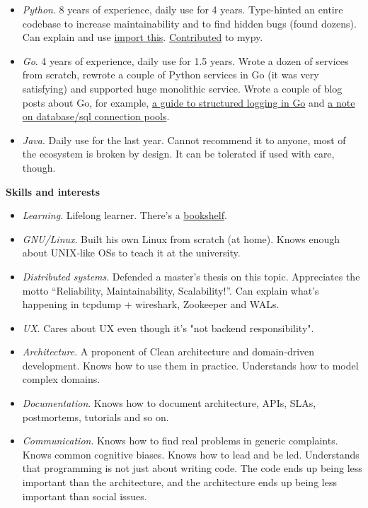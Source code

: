 \documentclass[final]{letter}
\begin{document}
\begin{itemize}
  \item \textit{Python}. 8 years of experience, daily use for 4 years.
    Type-hinted an entire codebase to increase maintainability and to find hidden bugs (found dozens).
    Can explain and use \href{https://www.python.org/dev/peps/pep-0020/}{import this}.
    \href{https://mypy-lang.blogspot.com/2019/06/mypy-0710-released-new-semantic-analyzer.html}{Contributed} to mypy.
  \item \textit{Go}. 4 years of experience, daily use for 1.5 years.
    Wrote a dozen of services from scratch, rewrote a couple of Python services in Go (it was very satisfying) and supported huge monolithic service.
    Wrote a couple of blog posts about Go, for example, \href{https://neexee.github.io/posts-en/how-to-structured-logging-in-go/}{a guide to structured logging in Go} and \href{https://neexee.github.io/posts-en/distributed-deadlock/}{a note on database/sql connection pools}.
  \item \textit{Java}. Daily use for the last year. Cannot recommend it to anyone, most of the ecosystem is broken by design. It can be tolerated if used with care, though.
\end{itemize}

{\bf Skills and interests}
\begin{itemize}
  \item \textit{Learning}. Lifelong learner. There's a \href{https://www.goodreads.com/review/list/43338630-sergey-machulskis?shelf=professional}{bookshelf}.
  \item \textit{GNU/Linux}. Built his own Linux from scratch (at home). Knows enough about UNIX-like OSs to teach it at the university.
  \item \textit{Distributed systems}. Defended a master's thesis on this topic. Appreciates the motto ``Reliability, Maintainability, Scalability!''.
    Can explain what's happening in tcpdump + wireshark, Zookeeper and WALs.
  \item \textit{UX}. Cares about UX even though it's "not backend responsibility".
  \item \textit{Architecture}. A proponent of Clean architecture and domain-driven development. Knows how to use them in practice. Understands how to model complex domains.
  \item \textit{Documentation}. Knows how to document architecture, APIs, SLAs, postmortems, tutorials and so on.
  \item \textit{Communication}. Knows how to find real problems in generic complaints. 
    Knows common cognitive biases. Knows how to lead and be led.
    Understands that programming is not just about writing code. The code ends up being less important than the architecture, and the architecture ends up being less important than social issues. 
\end{itemize}
\end{document}

